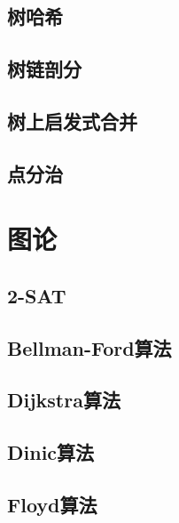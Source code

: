 \documentclass[twocolumn,a4]{article}  %
\begin{document}
		\subsection{树哈希}
	 	 	
	 	 	
		\subsection{树链剖分}
	 	 	
	 	 	
		\subsection{树上启发式合并}
	 	 	
	 	 	
		\subsection{点分治}
			
	 	 	
	\section{图论}
		\subsection{2-SAT}
	 	 	

		\subsection{Bellman-Ford算法}
	 	 	
	 	 	
		\subsection{Dijkstra算法}
	 	 	
	 	 	
		\subsection{Dinic算法}
	 	 	
	 	 	
		\subsection{Floyd算法}
	 	 	
	 	 	
\end{document}
